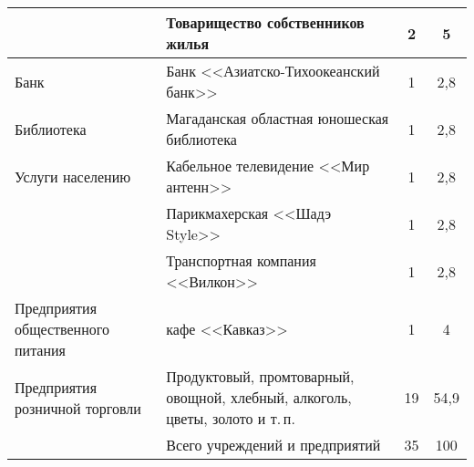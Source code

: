 \begin{table}[h!]
\begin{changemargin}{-1cm}{-1cm}
\begin{tabular}{p{5cm}p{7cm}cc}
                                        & Товарищество 				собственников жилья                                                                                                                      & 2               & 5               \\ \midrule
Банк                                    & Банк 				<<Азиатско-Тихоокеанский банк>>                                                                                                                    & 1               & 2,8               \\ \midrule
Библиотека                              & Магаданская 				областная юношеская библиотека                                                                                                            & 1               & 2,8               \\ \midrule
Услуги 				населению                    & Кабельное 				телевидение <<Мир антенн>>                                                                                                                    & 1               & 2,8               \\
                                        & Парикмахерская 				<<Шадэ Style>>                                                                                                                           & 1               & 2,8               \\
                                        & Транспортная 				компания <<Вилкон>>                                                                                                                        & 1               & 2,8               \\ \midrule
Предприятия 				общественного питания   &  кафе <<Кавказ>>                                                                                                                     & 1               & 4               \\ \midrule
Предприятия 				розничной торговли      & Продуктовый, 				промтоварный, овощной, хлебный, 				алкоголь, цветы, золото и т.\,п.                                                                       & 19              & 54,9              \\  \bottomrule
                                        & Всего учреждений и предприятий                                                                                                                            & 35              & 100\\


                                        \bottomrule
\end{tabular}
\end{changemargin}
\end{table}

